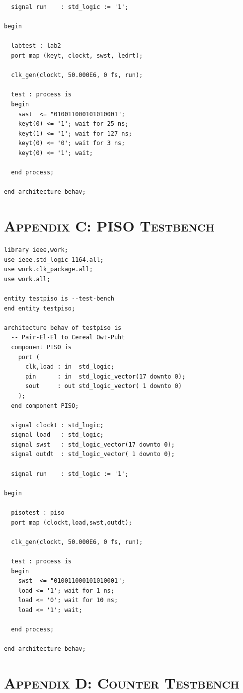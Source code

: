 \documentclass[11pt]{report}
\begin{document}
\begin{spacing}{1.5}
\begin{lstlisting}
  signal run    : std_logic := '1';

begin

  labtest : lab2
  port map (keyt, clockt, swst, ledrt);

  clk_gen(clockt, 50.000E6, 0 fs, run);

  test : process is
  begin
    swst  <= "010011000101010001";
    keyt(0) <= '1'; wait for 25 ns;
    keyt(1) <= '1'; wait for 127 ns;
    keyt(0) <= '0'; wait for 3 ns;
    keyt(0) <= '1'; wait;

  end process;

end architecture behav;
\end{lstlisting}

\chapter*{\scshape Appendix C: PISO Testbench}
\label{app:b}

\vspace{15px}
\begin{lstlisting}
library ieee,work;
use ieee.std_logic_1164.all;
use work.clk_package.all;
use work.all;

entity testpiso is --test-bench
end entity testpiso;

architecture behav of testpiso is
  -- Pair-El-El to Cereal Owt-Puht
  component PISO is
    port (
      clk,load : in  std_logic;
      pin      : in  std_logic_vector(17 downto 0);
      sout     : out std_logic_vector( 1 downto 0)
    );
  end component PISO;

  signal clockt : std_logic;
  signal load   : std_logic;
  signal swst   : std_logic_vector(17 downto 0);
  signal outdt  : std_logic_vector( 1 downto 0);

  signal run    : std_logic := '1';

begin

  pisotest : piso
  port map (clockt,load,swst,outdt);

  clk_gen(clockt, 50.000E6, 0 fs, run);

  test : process is
  begin
    swst  <= "010011000101010001";
    load <= '1'; wait for 1 ns;
    load <= '0'; wait for 10 ns;
    load <= '1'; wait;

  end process;

end architecture behav;
\end{lstlisting}

\chapter*{\scshape Appendix D: Counter Testbench}
\label{app:b}


\end{spacing}
\end{document}
